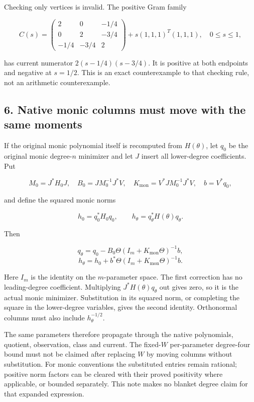 Checking only vertices is invalid. The positive Gram family

\[
 C(s)=\begin{pmatrix}2&0&-1/4\\0&2&-3/4\\-1/4&-3/4&2\end{pmatrix}
 +s(1,1,1)^T(1,1,1),\quad0\le s\le1,
\]

has current numerator \(2(s-1/4)(s-3/4)\). It is positive at both
endpoints and negative at \(s=1/2\). This is an exact counterexample to
that checking rule, not an arithmetic counterexample.

\subsection{6. Native monic columns must move with the same
moments}\label{native-monic-columns-must-move-with-the-same-moments}

If the original monic polynomial itself is recomputed from
\(H(\theta)\), let \(q_0\) be the original monic degree-\(n\) minimizer
and let \(J\) insert all lower-degree coefficients. Put

\[
 M_0=J^*H_0J,\quad B_0=J M_0^{-1}J^*V,
 \quad K_{\mathrm{mon}}=V^*J M_0^{-1}J^*V,
 \quad b=V^*q_0,
\]

and define the squared monic norms

\[
 h_0=q_0^*H_0q_0,\qquad
 h_\theta=q_\theta^*H(\theta)q_\theta.
\]

Then

\[
 \boxed{q_\theta=q_0-B_0\Theta(I_m+K_{\mathrm{mon}}\Theta)^{-1}b,}
\] \[
 \boxed{h_\theta=h_0+b^*\Theta(I_m+K_{\mathrm{mon}}\Theta)^{-1}b.}
\]

Here \(I_m\) is the identity on the \(m\)-parameter space. The first
correction has no leading-degree coefficient. Multiplying
\(J^*H(\theta)q_\theta\) out gives zero, so it is the actual monic
minimizer. Substitution in its squared norm, or completing the square in
the lower-degree variables, gives the second identity. Orthonormal
columns must also include \(h_\theta^{-1/2}\).

The same parameters therefore propagate through the native polynomials,
quotient, observation, class and current. The fixed-\(W\) per-parameter
degree-four bound must not be claimed after replacing \(W\) by moving
columns without substitution. For monic conventions the substituted
entries remain rational; positive norm factors can be cleared with their
proved positivity where applicable, or bounded separately. This note
makes no blanket degree claim for that expanded expression.

